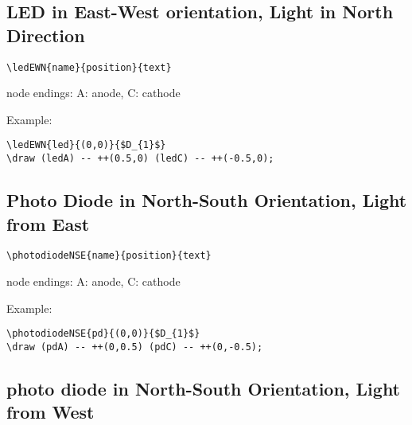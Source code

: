 \documentclass[parskip=full]{scrartcl}
\begin{document}
\subsection{LED in East-West orientation, Light in North Direction}

\begin{verbatim}
\ledEWN{name}{position}{text}
\end{verbatim}
node endings: A: anode, C: cathode

Example:\\
\begin{minipage}{0.8\textwidth}
\begin{verbatim}
\ledEWN{led}{(0,0)}{$D_{1}$}
\draw (ledA) -- ++(0.5,0) (ledC) -- ++(-0.5,0);
\end{verbatim}
\end{minipage}
\begin{minipage}{0.19\textwidth}
\end{minipage}

\subsection{Photo Diode in North-South Orientation, Light from East}

\begin{verbatim}
\photodiodeNSE{name}{position}{text}
\end{verbatim}
node endings: A: anode, C: cathode

Example:\\
\begin{minipage}{0.8\textwidth}
\begin{verbatim}
\photodiodeNSE{pd}{(0,0)}{$D_{1}$}
\draw (pdA) -- ++(0,0.5) (pdC) -- ++(0,-0.5);
\end{verbatim}
\end{minipage}
\begin{minipage}{0.19\textwidth}
\end{minipage}

\subsection{photo diode in North-South Orientation, Light from West}
\end{document}
